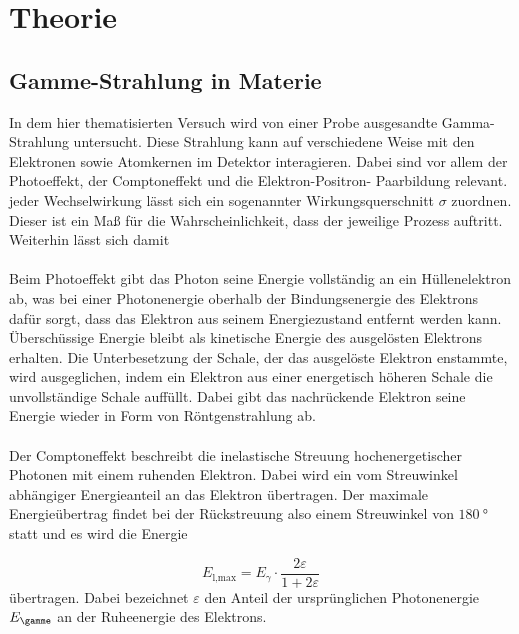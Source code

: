 \section{Theorie}
\label{sec:Theorie}


\subsection{Gamme-Strahlung in Materie}
\label{subsec:t1}

In dem hier thematisierten Versuch wird von einer Probe ausgesandte Gamma-Strahlung untersucht.
Diese Strahlung kann auf verschiedene Weise mit den Elektronen sowie Atomkernen im Detektor
interagieren.
Dabei sind vor allem der Photoeffekt, der Comptoneffekt und die Elektron-Positron-
Paarbildung relevant.
jeder Wechselwirkung lässt sich ein sogenannter Wirkungsquerschnitt
$\sigma$ zuordnen. Dieser ist ein Maß für die Wahrscheinlichkeit,
dass der jeweilige Prozess auftritt. Weiterhin lässt sich damit \\ \\
Beim Photoeffekt gibt das Photon seine Energie vollständig an ein Hüllenelektron ab, was bei
einer Photonenergie oberhalb der Bindungsenergie des Elektrons dafür sorgt, dass das Elektron
aus seinem Energiezustand entfernt werden kann. Überschüssige Energie bleibt als kinetische
Energie des ausgelösten Elektrons erhalten. Die Unterbesetzung der Schale, der das ausgelöste
Elektron enstammte, wird ausgeglichen, indem ein Elektron aus einer energetisch höheren Schale
die unvollständige Schale auffüllt. Dabei gibt das nachrückende Elektron seine Energie wieder
in Form von Röntgenstrahlung ab. \\ \\
Der Comptoneffekt beschreibt die inelastische Streuung hochenergetischer Photonen mit einem
ruhenden Elektron.
Dabei wird ein vom Streuwinkel abhängiger Energieanteil an das Elektron übertragen.
Der maximale Energieübertrag findet bei der Rückstreuung also einem Streuwinkel
von $\SI{180}{\degree}$ statt und es wird die Energie

\begin{equation}
  \label{eqn:e1t1}
  E_\text{l,max} = E_{\gamma} \cdot \frac{2\varepsilon}{1 + 2\varepsilon}
\end{equation}
übertragen. Dabei bezeichnet $\varepsilon$ den Anteil der ursprünglichen
Photonenergie $E_{\gamme}$ an der Ruheenergie des Elektrons.

\cite{sample}
